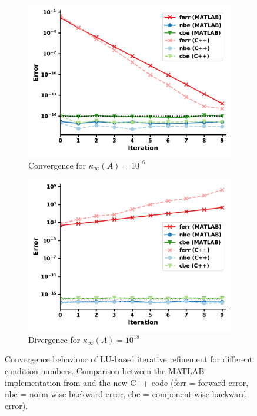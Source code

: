 \begin{figure}[h]
\centering
\begin{subfigure}{.5\textwidth}
  \centering
  \includegraphics[width=\linewidth]{chapters/5_experiments/figures/LUe16.pdf}
  \caption{Convergence for $\kappa_\infty(A) = 10^{16}$}
  \label{fig:lue16}
\end{subfigure}%
\begin{subfigure}{.5\textwidth}
  \centering
  \includegraphics[width=\linewidth]{chapters/5_experiments/figures/LUe18.pdf}
  \caption{Divergence for $\kappa_\infty(A) = 10^{18}$}
  \label{fig:lue18}
\end{subfigure}
\caption[LU-based IR]{Convergence behaviour of LU-based iterative refinement for different condition numbers. Comparison between the MATLAB implementation from \cite{carson_new_2017} and the new C++ code (ferr = forward error, nbe = norm-wise backward error, cbe = component-wise backward error).}
\label{fig:lue_ir}
\end{figure}

